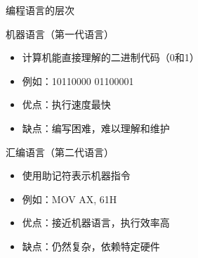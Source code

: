 \documentclass[UTF8,aspectratio=169]{beamer}
\begin{document}
\begin{frame}{编程语言的层次}
    \begin{ytublock}{机器语言（第一代语言）}
        \begin{itemize}
            \item 计算机能直接理解的二进制代码（0和1）
            \item 例如：10110000 01100001
            \item 优点：执行速度最快
            \item 缺点：编写困难，难以理解和维护
        \end{itemize}
    \end{ytublock}

    \begin{ytublock}{汇编语言（第二代语言）}
        \begin{itemize}
            \item 使用助记符表示机器指令
            \item 例如：MOV AX, 61H
            \item 优点：接近机器语言，执行效率高
            \item 缺点：仍然复杂，依赖特定硬件
        \end{itemize}
    \end{ytublock}
\end{frame}
\end{document}
